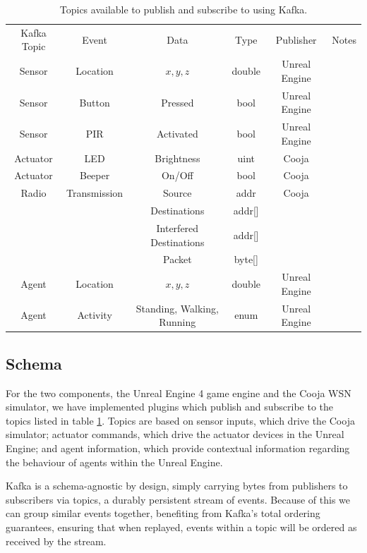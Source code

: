 \begin{table}[hb!]
\begin{tabular}{c|c|c|c|c|c}
Kafka Topic & Event & Data & Type & Publisher & Notes\\\hhline{=|=|=|=|=|=}
\rowcolor{red!50} Sensor & Location & $x, y, z$ & double & Unreal Engine & \\\hline
\rowcolor{red!50} Sensor & Button & Pressed & bool & Unreal Engine & \\\hline
\rowcolor{red!50} Sensor & PIR & Activated & bool & Unreal Engine & \\\hline
\rowcolor{green!50} Actuator & LED & Brightness & uint & Cooja & \\\hline
\rowcolor{green!50} Actuator & Beeper & On/Off & bool & Cooja & \\\hline
\rowcolor{blue!50}Radio & Transmission & Source & addr & Cooja & \\
\rowcolor{blue!50}      &              & Destinations & addr[] &  & \\
\rowcolor{blue!50}      &              & Interfered Destinations & addr[] &  & \\
\rowcolor{blue!50}      &              & Packet & byte[] &  & \\\hline
\rowcolor{orange!50}Agent & Location & $x, y, z$ & double & Unreal Engine &\\\hline
\rowcolor{orange!50}Agent & Activity & Standing, Walking, Running & enum & Unreal Engine &\\\hline
\end{tabular}
  \caption{Topics available to publish and subscribe to using Kafka.}
  \label{tab:topics_table}
\end{table}

\subsection{Schema} %
\label{ssub:schema}
For the two components, the Unreal Engine 4 game engine and the Cooja WSN simulator, we have implemented plugins which publish and subscribe to the topics listed in table \ref{tab:topics_table}. Topics are based on sensor inputs, which drive the Cooja simulator; actuator commands, which drive the actuator devices in the Unreal Engine; and agent information, which provide contextual information regarding the behaviour of agents within the Unreal Engine.

Kafka is a schema-agnostic by design, simply carrying bytes from publishers to subscribers via topics, a durably persistent stream of events. Because of this we can group similar events together, benefiting from Kafka's total ordering guarantees, ensuring that when replayed, events within a topic will be ordered as received by the stream. 

